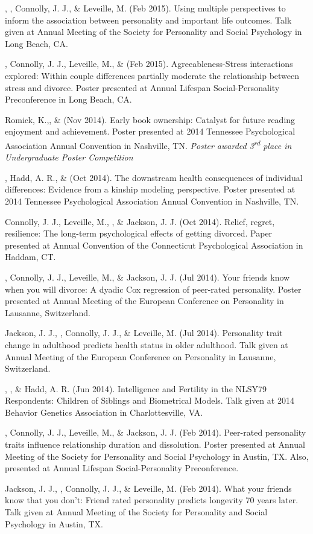 %
\item \jjj, \meb, Connolly, J. J., \& Leveille, M. (Feb 2015). Using multiple perspectives to inform the association between personality and important life outcomes. Talk given at Annual Meeting of the Society for Personality and Social Psychology in Long Beach, CA.
%
\item\meb, Connolly, J. J., Leveille, M., \& \jjj (Feb 2015). Agreeableness-Stress interactions explored: Within couple differences partially moderate the relationship between stress and divorce. Poster presented at Annual Lifespan Social-Personality Preconference in Long Beach, CA.
%
\item Romick, K.,\noteA \meb, \& \joe (Nov 2014). Early book ownership: Catalyst for future reading enjoyment and achievement. Poster presented at 2014 Tennessee Psychological Association Annual Convention in  Nashville, TN. \textit{Poster awarded 3\textsuperscript{rd} place in Undergraduate Poster Competition}
%
\item\meb, Hadd, A. R., \& \joe (Oct 2014). The downstream health consequences of individual differences: Evidence from a kinship modeling perspective. Poster presented at 2014 Tennessee Psychological Association Annual Convention in Nashville, TN.
%
\item Connolly, J. J., Leveille, M., \meb, \& Jackson, J. J. (Oct 2014). Relief, regret, resilience: The long-term psychological effects of getting divorced. Paper presented at Annual Convention of the Connecticut Psychological Association in Haddam, CT.
%
\item\meb, Connolly, J. J., Leveille, M., \& Jackson, J. J. (Jul 2014). Your friends know when you will divorce: A dyadic Cox regression of peer-rated personality. Poster presented at Annual Meeting of the European Conference on Personality in Lausanne, Switzerland.
%
\item Jackson, J. J., \meb, Connolly, J. J., \& Leveille, M. (Jul 2014). Personality trait change in adulthood predicts health status in older adulthood. Talk given at Annual Meeting of the European Conference on Personality in Lausanne, Switzerland.
%
\item \joe, \meb, \& Hadd, A. R. (Jun 2014). Intelligence and Fertility in the NLSY79 Respondents: Children of Siblings and Biometrical Models. Talk given at 2014 Behavior Genetics Association in Charlottesville, VA.
%
\item\meb, Connolly, J. J., Leveille, M., \& Jackson, J. J. (Feb 2014). Peer-rated personality traits influence relationship duration and dissolution. Poster presented at Annual Meeting of the Society for Personality and Social Psychology in Austin, TX. Also, presented at Annual Lifespan Social-Personality Preconference.
%
\item Jackson, J. J., \meb, Connolly, J. J., \& Leveille, M. (Feb 2014). What your friends know that you don't: Friend rated personality predicts longevity 70 years later. Talk given at Annual Meeting of the Society for Personality and Social Psychology in Austin, TX.
%


